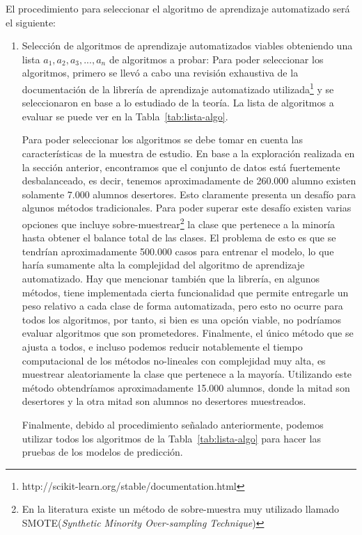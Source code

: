 El procedimiento para seleccionar el algoritmo de aprendizaje automatizado será el siguiente:
\begin{enumerate}
\item Selección de algoritmos de aprendizaje automatizados viables obteniendo una lista $a_1, a_2, a_3, ..., a_n$ de algoritmos a probar: Para poder seleccionar los algoritmos, primero se llevó a cabo una revisión exhaustiva de la documentación de la librería de aprendizaje automatizado utilizada\footnote{http://scikit-learn.org/stable/documentation.html} y se seleccionaron en base a lo estudiado de la teoría. La lista de algoritmos a evaluar se puede ver en la Tabla~\ref{tab:lista-algo}.

Para poder seleccionar los algoritmos se debe tomar en cuenta las características de la muestra de estudio. En base a la exploración realizada en la sección anterior, encontramos que el conjunto de datos está fuertemente desbalanceado, es decir, tenemos aproximadamente de 260.000 alumno existen solamente 7.000 alumnos desertores. Esto claramente presenta un desafío para algunos métodos tradicionales. Para poder superar este desafío existen varias opciones que incluye sobre-muestrear\footnote{En la literatura existe un método de sobre-muestra muy utilizado llamado SMOTE(\textit{Synthetic Minority Over-sampling Technique})} la clase que pertenece a la minoría hasta obtener el balance total de las clases. El problema de esto es que se tendrían aproximadamente 500.000 casos para entrenar el modelo, lo que haría sumamente alta la complejidad del algoritmo de aprendizaje automatizado. Hay que mencionar también que la librería, en algunos métodos, tiene implementada cierta funcionalidad que permite entregarle un peso relativo a cada clase de forma automatizada, pero esto no ocurre para todos los algoritmos, por tanto, si bien es una opción viable, no podríamos evaluar algoritmos que son prometedores. Finalmente, el único método que se ajusta a todos, e incluso podemos reducir notablemente el tiempo computacional de los métodos no-lineales con complejidad muy alta, es muestrear aleatoriamente la clase que pertenece a la mayoría. Utilizando este método obtendríamos aproximadamente 15.000 alumnos, donde la mitad son desertores y la otra mitad son alumnos no desertores muestreados.

Finalmente, debido al procedimiento señalado anteriormente, podemos utilizar todos los algoritmos de la Tabla~\ref{tab:lista-algo} para hacer las pruebas de los modelos de predicción.



\end{enumerate}
